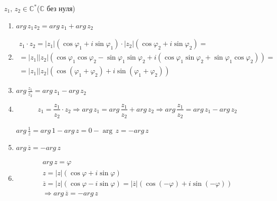 \documentclass[12pt,letterpaper]{report}
\makeatletter
\theoremstyle{definition}
\renewenvironment{proof}[1][\proofname]{%
   \par\pushQED{\qed}\normalfont%
   \topsep6\p@\@plus6\p@\relax
   \trivlist\item[\hskip\labelsep\bfseries#1\@addpunct{.}]%
   \ignorespaces
}{%
   \popQED\endtrivlist\@endpefalse
}
\makeatother
\begin{document}
$z_1,\, z_2 \in \mathbb{C}^*$($\mathbb{C}$ без нуля)
\begin{enumerate}
  \item $arg\,z_1z_2 = arg\,z_1 + arg\,z_2$
  \begin{proof}
    \begin{gather*}
      z_1 \cdot z_2 = |z_1|(\cos\varphi_1 + i\sin\varphi_1) \cdot |z_2|(\cos\varphi_2 + i\sin\varphi_2) =  \\
      = |z_1||z_2|(\cos\varphi_1\cos\varphi_2 - \sin\varphi_1\sin\varphi_2 + i(\cos\varphi_1\sin\varphi_2 + \sin\varphi_1\cos\varphi_2)) = \\
      = |z_1||z_2|(\cos(\varphi_1 + \varphi_2) + i\sin(\varphi_1 + \varphi_2))
    \end{gather*}
  \end{proof}
  \item $arg\,\frac{z_1}{z_2} = arg\,z_1 - arg\,z_2$
  \begin{proof}  
      \[ z_1 = \frac{z_1}{z_2} \cdot z_2 \Rightarrow arg\,z_1 = arg\,\frac{z_1}{z_2} + arg\,z_2 \Rightarrow arg\,\frac{z_1}{z_2} = arg\,z_1 - arg\,z_2 \]
  \end{proof}
  \begin{notice}
    $arg\,\frac{1}{z} = arg\,1 - arg\,z = 0 - \arg\,z = -arg\,z$
  \end{notice}
  \item $arg\,\overline{z} = -arg\,z$
  \begin{proof}
    \begin{gather*}
      arg\,z = \varphi \\
      z = |z|(\cos\varphi + i\sin\varphi) \\
      \overline{z} = |z|(\cos\varphi - i\sin\varphi) = |\overline{z}|(\cos(-\varphi) + i\sin(-\varphi)) \\
      \Rightarrow arg\,\overline{z} = -arg\,z
    \end{gather*}
  \end{proof}
\end{enumerate}
\end{document}
